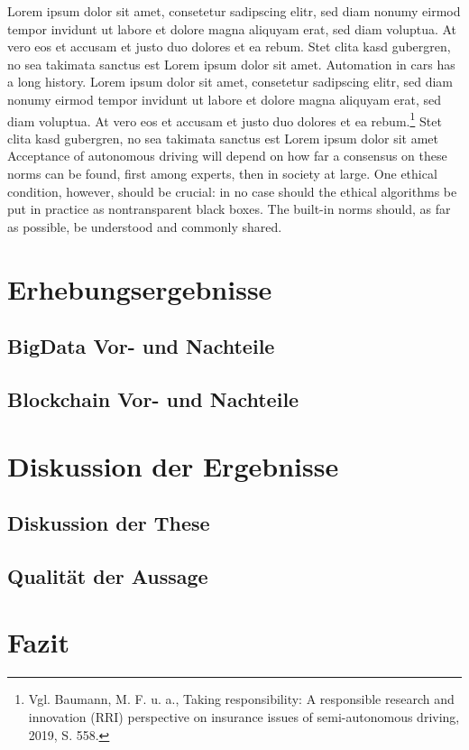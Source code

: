 Lorem ipsum dolor sit amet, consetetur sadipscing elitr, sed diam nonumy eirmod tempor invidunt ut labore et dolore magna aliquyam erat, sed diam voluptua.
At vero eos et accusam et justo duo dolores et ea rebum.
Stet clita kasd gubergren, no sea takimata sanctus est Lorem ipsum dolor sit amet.
Automation in cars has a long history.  Lorem ipsum dolor sit amet, consetetur sadipscing elitr, sed diam nonumy eirmod tempor invidunt ut labore et dolore magna aliquyam erat, sed diam voluptua.
At vero eos et accusam et justo duo dolores et ea rebum.\footnote{Vgl. Baumann, M. F. u. a., Taking responsibility: A responsible research and innovation (RRI) perspective on insurance issues of semi-autonomous driving, 2019, S. 558.}
Stet clita kasd gubergren, no sea takimata sanctus est Lorem ipsum dolor sit amet Acceptance of autonomous driving will depend on how far a consensus on these norms can be found, first among experts, then in society at large.
One ethical condition, however, should be crucial: in no case should the ethical algorithms be put in practice as nontransparent black boxes.
The built-in norms should, as far as possible, be understood and commonly shared.


\section{Erhebungsergebnisse}
\subsection{BigData Vor- und Nachteile}
\subsection{Blockchain Vor- und Nachteile}

\section{Diskussion der Ergebnisse}
\subsection{Diskussion der These}
\subsection{Qualität der Aussage}

\section{Fazit}